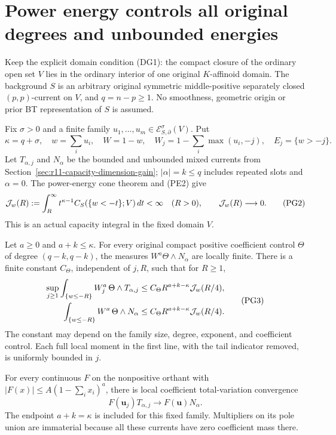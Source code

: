 \section{Power energy controls all original degrees and unbounded energies}
\label{sec:r11-power-all-degree}

Keep the explicit domain condition (DG1): the compact closure of
the ordinary open set $V$ lies in the ordinary interior of one
original $K$-affinoid domain. The background $S$ is an arbitrary
original symmetric middle-positive separately closed $(p,p)$-current
on $V$, and $q=n-p\geq1$. No smoothness, geometric origin or prior
BT representation of $S$ is assumed.

Fix $\sigma>0$ and a finite family
$u_1,\ldots,u_m\in\mathcal E^\sigma_{S,\partial}(V)$. Put
\[
 \kappa=q+\sigma,\quad w=\sum_i u_i,\quad W=1-w,\quad
 W_j=1-\sum_i\max(u_i,-j),\quad E_j=\{w>-j\}.
 \tag{PG1}
\]
Let $T_{\alpha,j}$ and $N_\alpha$ be the bounded and unbounded
mixed currents from Section~\ref{sec:r11-capacity-dimension-gain};
$|\alpha|=k\leq q$ includes repeated slots and $\alpha=0$.
The power-energy cone theorem and (PE2) give
\[
 {\cal J}_w(R):=\int_R^\infty
       t^{\kappa-1}C_S(\{w<-t\};V)\,dt<\infty
       \quad(R>0),\qquad {\cal J}_w(R)\longrightarrow0.
 \tag{PG2}
\]
This is an actual capacity integral in the fixed domain $V$.

\begin{lemma}
\label{lem:r11-graded-curvature-moments}
Let $a\geq0$ and $a+k\leq\kappa$. For every original compact
positive coefficient control $\Theta$ of degree $(q-k,q-k)$,
the measures $W^a\Theta\wedge N_\alpha$ are locally finite.
There is a finite constant $C_\Theta$, independent of $j,R$, such
that for $R\geq1$,
\[
 \begin{split}
 \sup_{j\geq1}\int_{\{w\leq-R\}}W_j^a\,
                           \Theta\wedge T_{\alpha,j}
     &\leq C_\Theta R^{a+k-\kappa}{\cal J}_w(R/4),\\
 \int_{\{w\leq-R\}}W^a\,\Theta\wedge N_\alpha
     &\leq C_\Theta R^{a+k-\kappa}{\cal J}_w(R/4).
 \end{split}
 \tag{PG3}
\]
The constant may depend on the family size, degree, exponent,
and coefficient control. Each full local moment in the first
line, with the tail indicator removed, is uniformly bounded in $j$.

For every continuous $F$ on the nonpositive orthant with
$|F(x)|\leq A(1-\sum_i x_i)^a$, there is local coefficient
total-variation convergence
\[
               F(\mathbf u_j)T_{\alpha,j}
                          \longrightarrow F(\mathbf u)N_\alpha.
 \tag{PG4}
\]
The endpoint $a+k=\kappa$ is included for this fixed family.
Multipliers on its pole union are immaterial because all these
currents have zero coefficient mass there.
\end{lemma}

